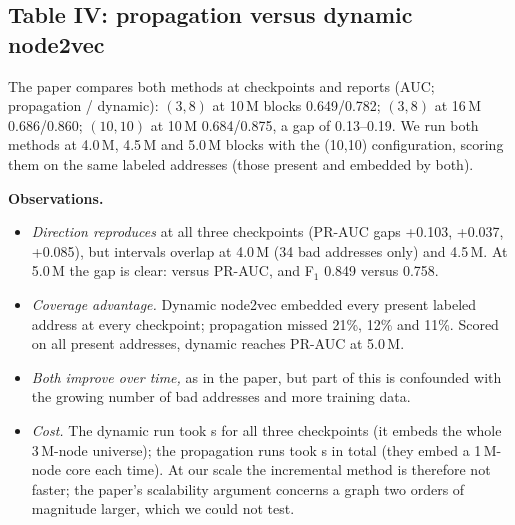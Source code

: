 \documentclass[11pt,a4paper]{article}
\begin{document}
\subsection{Table IV: propagation versus dynamic node2vec}
The paper compares both methods at checkpoints and reports (AUC; propagation / dynamic): $(3,8)$ at 10\,M blocks 0.649/0.782; $(3,8)$ at 16\,M 0.686/0.860; $(10,10)$ at 10\,M 0.684/0.875, a gap of 0.13--0.19. We run both methods at 4.0\,M, 4.5\,M and 5.0\,M blocks with the (10,10) configuration, scoring them on the same labeled addresses (those present and embedded by both).
\begin{table}[H]
\centering\scriptsize

\caption{Propagation versus dynamic node2vec, node2vec features only. ``Shared set'' = labeled addresses present at that block and embedded by both methods; PR-AUC and F$_1$ are scored there.}
\label{tab:t4}
\end{table}
\textbf{Observations.}
\begin{itemize}
\item \emph{Direction reproduces} at all three checkpoints (PR-AUC gaps +0.103, +0.037, +0.085), but intervals overlap at 4.0\,M (34 bad addresses only) and 4.5\,M. At 5.0\,M the gap is clear: \TFourDynPR{} versus \TFourPropPR{} PR-AUC, and F$_1$ 0.849 versus 0.758.
\item \emph{Coverage advantage.} Dynamic node2vec embedded every present labeled address at every checkpoint; propagation missed 21\%, 12\% and 11\%. Scored on all present addresses, dynamic reaches \DynAllPR{} PR-AUC at 5.0\,M.
\item \emph{Both improve over time,} as in the paper, but part of this is confounded with the growing number of bad addresses and more training data.
\item \emph{Cost.} The dynamic run took \DynSeconds{} s for all three checkpoints (it embeds the whole 3\,M-node universe); the propagation runs took \PropSeconds{} s in total (they embed a 1\,M-node core each time). At our scale the incremental method is therefore not faster; the paper's scalability argument concerns a graph two orders of magnitude larger, which we could not test.
\end{itemize}
\end{document}
